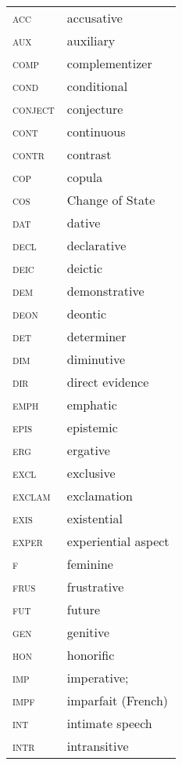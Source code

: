 



\begin{tabularx}{.45\textwidth}{>{\scshape}lQ} 
acc & accusative\\
aux & auxiliary\\
comp & complementizer\\
cond & conditional\\
conject & conjecture\\
cont & continuous\\
contr & contrast\\
cop & copula\\
cos & Change of State\\
dat & dative\\
decl & declarative\\
deic & deictic\\
dem & demonstrative\\
deon & deontic\\
det & determiner\\
dim & diminutive\\
dir & direct evidence\\
emph & emphatic\\
epis & epistemic\\
erg & ergative\\
excl & exclusive\\
exclam & exclamation\\
exis & existential\\
exper & experiential aspect\\
f & feminine\\
frus & frustrative\\
fut & future\\
gen & genitive\\
hon & honorific\\
imp &  imperative; \\
impf & imparfait (French)\\
int & intimate speech\\
intr & intransitive\\
\end{tabularx}
